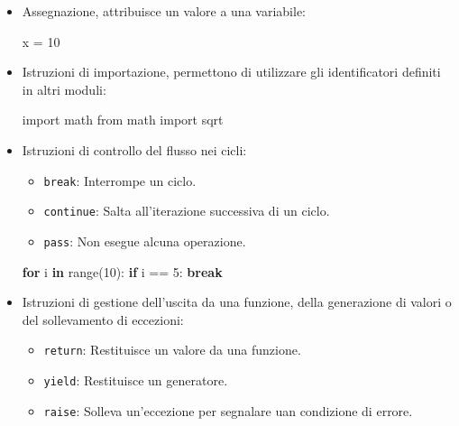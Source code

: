 \documentclass[
  letterpaper,
]{scrbook}
\newenvironment{Shaded}{\begin{snugshade}}{\end{snugshade}}
\newcommand{\BuiltInTok}[1]{\textcolor[rgb]{0.00,0.23,0.31}{#1}}
\newcommand{\ControlFlowTok}[1]{\textcolor[rgb]{0.00,0.23,0.31}{\textbf{#1}}}
\newcommand{\DecValTok}[1]{\textcolor[rgb]{0.68,0.00,0.00}{#1}}
\newcommand{\ImportTok}[1]{\textcolor[rgb]{0.00,0.46,0.62}{#1}}
\newcommand{\KeywordTok}[1]{\textcolor[rgb]{0.00,0.23,0.31}{\textbf{#1}}}
\newcommand{\NormalTok}[1]{\textcolor[rgb]{0.00,0.23,0.31}{#1}}
\newcommand{\OperatorTok}[1]{\textcolor[rgb]{0.37,0.37,0.37}{#1}}
\providecommand{\tightlist}{%
  \setlength{\itemsep}{0pt}\setlength{\parskip}{0pt}}\usepackage{longtable,booktabs,array}
\begin{document}
\begin{itemize}
\item
  Assegnazione, attribuisce un valore a una variabile:

\begin{Shaded}
\begin{Highlighting}[]
\NormalTok{x }\OperatorTok{=} \DecValTok{10}
\end{Highlighting}
\end{Shaded}
\item
  Istruzioni di importazione, permettono di utilizzare gli
  identificatori definiti in altri moduli:

\begin{Shaded}
\begin{Highlighting}[]
\ImportTok{import}\NormalTok{ math}
\ImportTok{from}\NormalTok{ math }\ImportTok{import}\NormalTok{ sqrt}
\end{Highlighting}
\end{Shaded}
\item
  Istruzioni di controllo del flusso nei cicli:

  \begin{itemize}
  \tightlist
  \item
    \texttt{break}: Interrompe un ciclo.
  \item
    \texttt{continue}: Salta all'iterazione successiva di un ciclo.
  \item
    \texttt{pass}: Non esegue alcuna operazione.
  \end{itemize}

\begin{Shaded}
\begin{Highlighting}[]
\ControlFlowTok{for}\NormalTok{ i }\KeywordTok{in} \BuiltInTok{range}\NormalTok{(}\DecValTok{10}\NormalTok{):}
    \ControlFlowTok{if}\NormalTok{ i }\OperatorTok{==} \DecValTok{5}\NormalTok{:}
        \ControlFlowTok{break}
\end{Highlighting}
\end{Shaded}
\item
  Istruzioni di gestione dell'uscita da una funzione, della generazione
  di valori o del sollevamento di eccezioni:

  \begin{itemize}
  \tightlist
  \item
    \texttt{return}: Restituisce un valore da una funzione.
  \item
    \texttt{yield}: Restituisce un generatore.
  \item
    \texttt{raise}: Solleva un'eccezione per segnalare uan condizione di
    errore.
  \end{itemize}


\end{itemize}
\end{document}
